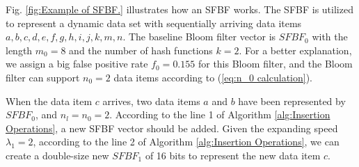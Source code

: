 \documentclass[10pt,journal,compsoc]{IEEEtran}
\begin{document}

Fig. \ref{fig:Example of SFBF.} illustrates how an SFBF works. The SFBF is utilized to represent a dynamic data set with sequentially arriving data items  $a, b, c, d, e, f, g, h, i, j, k, m, n$. The baseline Bloom filter vector is $SFBF_0$ with  the length $m_0=8$ and the number of hash functions $k=2$. For a better explanation, we assign a big false positive rate $f_0=0.155$ for this Bloom filter, and the Bloom filter can support $n_0=2$ data items according to (\ref{eq:n_0 calculation}).

When the data item $c$ arrives, two data items $a$ and $b$ have been represented by $SFBF_0$, and $n_l=n_0=2$. According to the line 1 of Algorithm \ref{alg:Insertion Operations}, a new SFBF vector should be added. Given the expanding speed ${\lambda _1} = 2$, according to the line 2 of Algorithm \ref{alg:Insertion Operations}, we can create a double-size new $SFBF_1$ of 16 bits to represent the new data item $c$.
\end{document}
